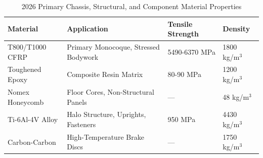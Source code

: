 \begin{table}[h]
\centering
\caption{2026 Primary Chassis, Structural, and Component Material Properties}
\vspace{0.2cm}
\begin{tabularx}{\textwidth}{@{}XXXX@{}}
\toprule
\textbf{Material} & \textbf{Application} & \textbf{Tensile Strength} & \textbf{Density} \\
\midrule
T800/T1000 CFRP & Primary Monocoque, Stressed Bodywork & 5490-6370 MPa & 1800 kg/m$^3$ \\
Toughened Epoxy & Composite Resin Matrix & 80-90 MPa & 1200 kg/m$^3$ \\
Nomex Honeycomb & Floor Cores, Non-Structural Panels & --- & 48 kg/m$^3$ \\
Ti-6Al-4V Alloy & Halo Structure, Uprights, Fasteners & 950 MPa & 4430 kg/m$^3$ \\
Carbon-Carbon   & High-Temperature Brake Discs & --- & 1750 kg/m$^3$ \\
\bottomrule
\end{tabularx}
\label{tab:materials}
\end{table}


